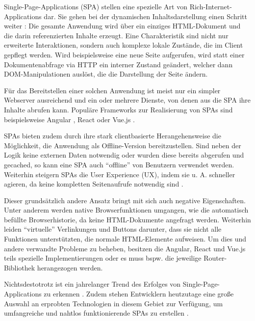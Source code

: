 Single-Page-Applications (SPA) stellen eine spezielle Art von Rich-Internet-Applications dar. Sie gehen bei der dynamischen Inhaltsdarstellung einen Schritt weiter \cite{SinglePageApplication}: Die gesamte Anwendung wird über ein einziges HTML-Dokument und die darin referenzierten Inhalte erzeugt. Eine Charakteristik sind nicht nur erweiterte Interaktionen, sondern auch komplexe lokale Zustände, die im Client gepflegt werden. Wird beispielsweise eine neue Seite aufgerufen, wird statt einer Dokumentenabfrage via HTTP ein interner Zustand geändert, welcher dann DOM-Manipulationen auslöst, die die Darstellung der Seite ändern.

Für das Bereitstellen einer solchen Anwendung ist meist nur ein simpler Webserver ausreichend und ein oder mehrere Dienste, von denen aus die SPA ihre Inhalte abrufen kann. Populäre Frameworks zur Realisierung von SPAs sind beispielsweise Angular \cite{AngularHomepage}, React \cite{ReactHomepage} oder Vue.js \cite{VueJSHomepage}.

SPAs bieten zudem durch ihre stark clientbasierte Herangehensweise die Möglichkeit, die Anwendung als Offline-Version bereitzustellen. Sind neben der Logik keine externen Daten notwendig oder wurden diese bereits abgerufen und gecached, so kann eine SPA auch \enquote{offline} von Benutzern verwendet werden. Weiterhin steigern SPAs die User Experience (UX), indem sie u. A. schneller agieren, da keine kompletten Seitenaufrufe notwendig sind \cite{ImprovementOfAcedemicServiceBasedOnSPA}.

Dieser grundsätzlich andere Ansatz bringt mit sich auch negative Eigenschaften. Unter anderem werden native Browserfunktionen umgangen, wie die automatisch befüllte Browserhistorie, da keine  HTML-Dokumente angefragt werden. Weiterhin leiden \enquote{virtuelle} Verlinkungen und Buttons darunter, dass sie nicht alle Funktionen unterstützten, die normale HTML-Elemente aufweisen. Um dies und andere verwandte Probleme zu beheben, besitzen die Angular, React und Vue.js teils spezielle Implementierungen oder es muss bspw. die jeweilige Router-Bibliothek herangezogen werden.

Nichtsdestotrotz ist ein jahrelanger Trend des Erfolges von Single-Page-Applications zu erkennen \cite{SinglePageApplication}. Zudem stehen Entwicklern heutzutage eine große Auswahl an erprobten Technologien in diesem Gebiet zur Verfügung, um umfangreiche und nahtlos funktionierende SPAs zu erstellen \cite{TheStateOfJavaScript2020}.